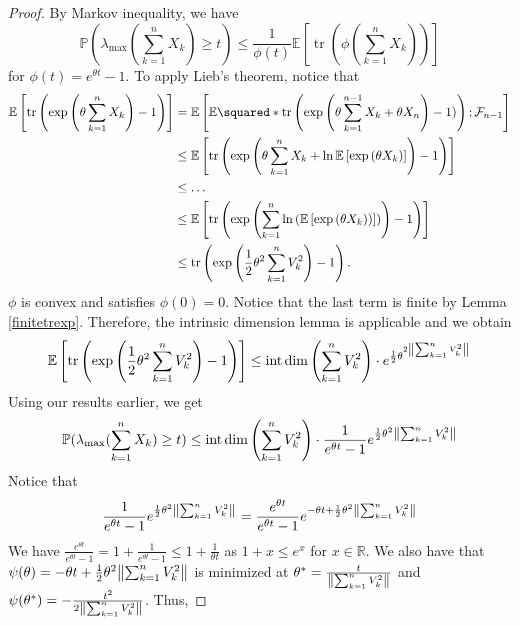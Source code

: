 \begin{proof}
    By Markov inequality, we have 
    \[ \mathbb{P}(\lambda_{\text{max}} (\sum_{k=1}^{n}X_k) \geq t) \leq \frac{1}{\phi(t)} \mathbb{E}\left[\operatorname{tr}\left(\phi(\sum_{k=1}^{n}X_k)\right)\right] \]
    for \( \phi(t) = e^{\theta t}-1\). To apply Lieb's theorem, notice that
    \begin{align*}
      \mathbb{E}\left[\operatorname{tr}\left(\operatorname{exp}\left(\theta \sum_{k=1}^{n} X_k\right)-1\right)\right] &= \mathbb{E}\left[ \mathbb{E}\squared*{\operatorname{tr}\left(\operatorname{exp}\left(\theta \sum_{k=1}^{n-1}X_k+\theta X_n\right)-1)\right);\mathcal{F}_{n-1}}\right] \\
                                                                                                                      & \leq \mathbb{E}\left[\operatorname{tr}\left(\operatorname{exp}\left(\theta \sum_{k=1}^{n}X_k+ \operatorname{ln} \mathbb{E}\left[\operatorname{exp}\left(\theta X_k\right)\right]\right)-1\right)\right] \\
                      & \leq \dots \\
                      & \leq \mathbb{E}\left[\operatorname{tr}\left(\operatorname{exp}\left(\sum_{k=1}^{n} \operatorname{ln}\left(\mathbb{E}\left[\operatorname{exp}\left(\theta X_k)\right)\right]\right)\right)-1\right)\right] \\
                      & \leq \operatorname{tr}\left(\operatorname{exp}\left(\frac{1}{2}\theta^{2}\sum_{k=1}^{n}V_k^{2}\right)-1\right).
    \end{align*}
    \( \phi \) is convex and satisfies \( \phi(0)=0 \). Notice that the last term is finite by Lemma \ref{finitetrexp}. Therefore, the intrinsic dimension lemma is applicable and we obtain
    \[ \mathbb{E}\left[\operatorname{tr}\left(\operatorname{exp}\left(\frac{1}{2}\theta^{2}\sum_{k=1}^{n}V_k^{2}\right)-1\right)\right] \leq \operatorname{int\, dim}\left(\sum_{k=1}^{n}V_k^{2}\right) \cdot e^{\frac{1}{2} \theta^{2 \norm{\sum_{k=1}^{n}V_k^{2}}_{}}} \] 
    Using our results earlier, we get
    \[ \mathbb{P}(\lambda_{\text{max}} (\sum_{k=1}^{n}X_k) \geq t) \leq \operatorname{int\, dim}\left(\sum_{k=1}^{n}V_k^{2}\right) \cdot \frac{1}{e^{\theta t}-1} e^{\frac{1}{2}\theta^{2}\norm{\sum_{k=1}^{n}V_k^{2}}_{}} \]
    Notice that 
    \[ \frac{1}{e^{\theta t}-1} e^{\frac{1}{2} \theta^{2} \norm{\sum_{k=1}^{n}V_k^{2}}_{}} = \frac{e^{\theta t}}{e^{\theta t}-1} e^{-\theta t+ \frac{1}{2}\theta^{2} \norm{\sum_{k=1}^{n}V_k^{2}}_{}} \]
    We have \( \frac{e^{\theta t}}{e^{\theta t }-1}=1+ \frac{1}{e^{\theta t}-1} \leq 1+ \frac{1}{\theta t} \) as \( 1+x \leq e^{x} \) for \( x \in \mathbb{R} \). We also have that \( \psi(\theta) = - \theta t + \frac{1}{2} \theta^{2} \norm{\sum_{k=1}^{n}V_k^{2}}_{} \) is minimized at \( \theta^{*}= \frac{t}{\norm{\sum_{k=1}^{n}V_k^{2}}} \) and \( \psi(\theta^{*})= -\frac{t^{2}}{2 \norm{\sum_{k=1}^{n}V_k^{2}}} \). Thus,

\end{proof}
